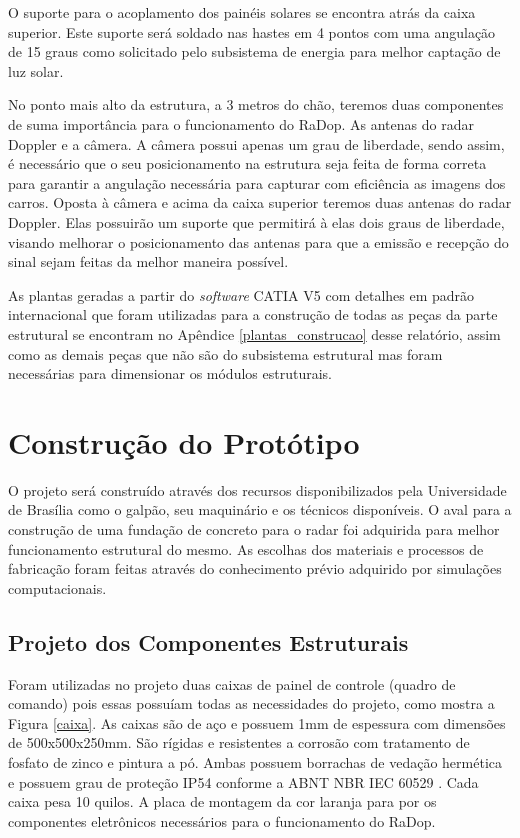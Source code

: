 O suporte para o acoplamento dos painéis solares se encontra atrás da caixa superior. Este suporte será soldado nas hastes em 4 pontos com uma angulação de 15 graus como solicitado pelo subsistema de energia para melhor captação de luz solar. 

No ponto mais alto da estrutura, a 3 metros do chão, teremos duas componentes de suma importância para o funcionamento do RaDop. As antenas do radar Doppler e a câmera. A câmera possui apenas um grau de liberdade, sendo assim, é necessário que o seu posicionamento na estrutura seja feita de forma correta para garantir a angulação necessária para capturar com eficiência as imagens dos carros. Oposta à câmera e acima da caixa superior teremos duas antenas do radar Doppler. Elas possuirão um suporte que permitirá à elas dois graus de liberdade, visando melhorar o posicionamento das antenas para que a emissão e recepção do sinal sejam feitas da melhor maneira possível.

As plantas geradas a partir do \textit{software} CATIA V5 com detalhes em padrão internacional que foram utilizadas para a construção de todas as peças da parte estrutural se encontram no Apêndice \ref{plantas_construcao} desse relatório, assim como as demais peças que não são do subsistema estrutural mas foram necessárias para dimensionar os módulos estruturais.

\section{Construção do Protótipo}

O projeto será construído através dos recursos disponibilizados pela Universidade de Brasília como o galpão, seu maquinário e os técnicos disponíveis. O aval para a construção de uma fundação de concreto para o radar foi adquirida para melhor funcionamento estrutural do mesmo. As escolhas dos materiais e processos de fabricação foram feitas através do conhecimento prévio adquirido por simulações computacionais. 

\subsection{Projeto dos Componentes Estruturais}

Foram utilizadas no projeto duas caixas de painel de controle (quadro de comando) pois essas possuíam todas as necessidades do projeto, como mostra a Figura \ref{caixa}. As caixas são de aço e possuem 1mm de espessura com dimensões de 500x500x250mm. São rígidas e resistentes a corrosão com tratamento de fosfato de zinco e pintura a pó. Ambas possuem borrachas de vedação hermética e possuem grau de proteção IP54 conforme a ABNT NBR IEC 60529 \cite{involucro}. Cada caixa pesa 10 quilos. A placa de montagem da cor laranja para por os componentes eletrônicos necessários para o funcionamento do RaDop.

